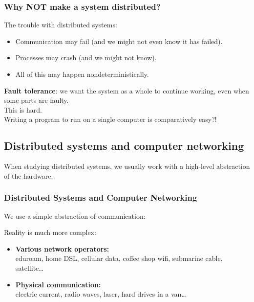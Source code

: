 \begin{frame}
    \label{s:why-not}
    \frametitle{Why NOT make a system distributed?}
    The trouble with distributed systems:
    \begin{itemize}
        \item Communication may fail (and we might not even know it has failed).
        \item Processes may crash (and we might not know).
        \item All of this may happen nondeterministically.
    \end{itemize}\vspace{1em}\pause
    \textbf{Fault tolerance}: we want the system as a whole to continue working, even when some parts are faulty.\\[1em]
    This is hard.\\[1em]
    Writing a program to run on a single computer is comparatively easy?!
\end{frame}


\subsection{Distributed systems and computer networking}\label{sec:networking}

When studying distributed systems, we usually work with a high-level abstraction of the hardware.

\begin{frame}
    \label{s:networking}
    \frametitle{Distributed Systems and Computer Networking}
    We use a simple abstraction of communication:
    \begin{center}
    \end{center}\pause

    Reality is much more complex:
    \begin{itemize}
        \item \textbf{Various network operators:}\\ eduroam, home DSL, cellular data, coffee shop wifi, submarine cable, satellite\dots\\[1em]
        \item \textbf{Physical communication:}\\ electric current, radio waves, laser, hard drives in a van\dots
    \end{itemize}
\end{frame}

